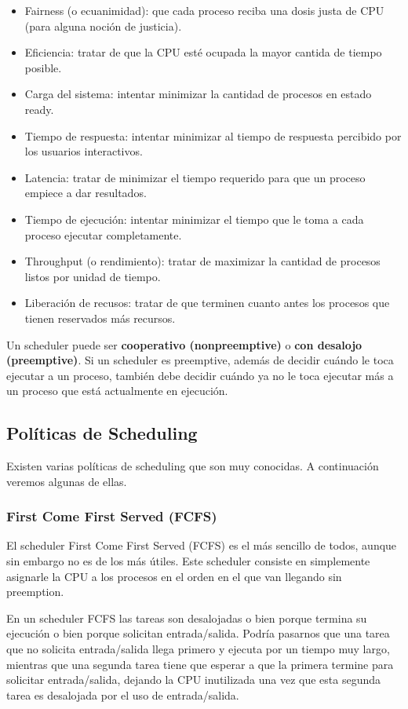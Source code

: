 \documentclass{article}
\begin{document}
\begin{itemize}
\item Fairness (o ecuanimidad): que cada proceso reciba una dosis justa de CPU (para alguna noci\'on de justicia).
\item Eficiencia: tratar de que la CPU est\'e ocupada la mayor cantida de tiempo posible.
\item Carga del sistema: intentar minimizar la cantidad de procesos en estado ready.
\item Tiempo de respuesta: intentar minimizar al tiempo de respuesta percibido por los usuarios interactivos.
\item Latencia: tratar de minimizar el tiempo requerido para que un proceso empiece a dar resultados.
\item Tiempo de ejecuci\'on: intentar minimizar el tiempo que le toma a cada proceso ejecutar completamente.
\item Throughput (o rendimiento): tratar de maximizar la cantidad de procesos listos por unidad de tiempo.
\item Liberaci\'on de recusos: tratar de que terminen cuanto antes los procesos que tienen reservados m\'as recursos.
\end{itemize}

Un scheduler puede ser \textbf{cooperativo (nonpreemptive)} o \textbf{con desalojo (preemptive)}. Si un scheduler es preemptive, adem\'as de decidir cu\'ando le toca ejecutar a un proceso, tambi\'en debe decidir cu\'ando ya no le toca ejecutar m\'as a un proceso que est\'a actualmente en ejecuci\'on.

\subsection{Pol\'iticas de Scheduling}

Existen varias pol\'iticas de scheduling que son muy conocidas. A continuaci\'on veremos algunas de ellas.

\subsubsection{First Come First Served (FCFS)}

El scheduler First Come First Served (FCFS) es el m\'as sencillo de todos, aunque sin embargo no es de los m\'as \'utiles. Este scheduler consiste en simplemente asignarle la CPU a los procesos en el orden en el que van llegando sin preemption.

En un scheduler FCFS las tareas son desalojadas o bien porque termina su ejecuci\'on o bien porque solicitan entrada/salida. Podr\'ia pasarnos que una tarea que no solicita entrada/salida llega primero y ejecuta por un tiempo muy largo, mientras que una segunda tarea tiene que esperar a que la primera termine para solicitar entrada/salida, dejando la CPU inutilizada una vez que esta segunda tarea es desalojada por el uso de entrada/salida.
\end{document}
